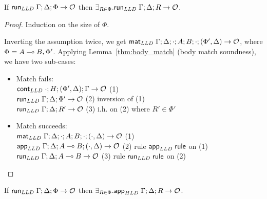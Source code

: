 \begin{theorem}\label{thm:one_rule}
If $\mathsf{run}_{LLD} \; \Gamma; \Delta; \Phi \rightarrow \mathcal{O}$ then
$\exists_{R \in \Phi}. \mathsf{run}_{LLD} \; \Gamma; \Delta; R \rightarrow \mathcal{O}$.
\end{theorem}
\begin{proof}
Induction on the size of $\Phi$.

Inverting the assumption twice, we get $\mathsf{mat}_{LLD} \; \Gamma; \Delta; \cdot; A; B; \cdot;
(\Phi', \Delta) \rightarrow \mathcal{O}$, where $\Phi = A \multimap B, \Phi'$. Applying Lemma~\ref{thm:body_match} (body match soundness), we have two sub-cases:

\begin{itemize}[leftmargin=*]
   \item Match fails: \\ $\mathsf{cont}_{LLD} \; \cdot; H; (\Phi', \Delta); \Gamma \rightarrow
   \mathcal{O}$ \hfill (1)\\
   $\mathsf{run}_{LLD} \; \Gamma; \Delta; \Phi' \rightarrow \mathcal{O}$ \hfill (2) inversion of (1) \\
   $\mathsf{run}_{LLD} \; \Gamma; \Delta; R' \rightarrow \mathcal{O}$ \hfill (3) i.h. on (2) where $R' \in \Phi'$ \\
   \item Match succeeds: \\
   $\mathsf{mat}_{LLD} \; \Gamma; \Delta; \cdot; A; B; \cdot; (\cdot, \Delta) \rightarrow \mathcal{O}$ \hfill (1)\\
   $\mathsf{app}_{LLD} \; \Gamma; \Delta; A \multimap B; (\cdot, \Delta) \rightarrow \mathcal{O}$ \hfill (2) rule $\mathsf{app}_{LLD} \; \mathsf{rule}$ on (1) \\
   $\mathsf{run}_{LLD} \; \Gamma; \Delta; A \multimap B \rightarrow \mathcal{O}$ \hfill (3) rule $\mathsf{run}_{LLD} \; \mathsf{rule}$ on (2) \\
\end{itemize}
\end{proof}

\begin{theorem}[Soundness]\label{thm:soundness}
If $\mathsf{run}_{LLD} \; \Gamma; \Delta; \Phi \rightarrow \mathcal{O}$ then $\exists_{R \in \Phi}.
\mathsf{app}_{HLD} \; \Gamma ; \Delta ; R \rightarrow \mathcal{O}$.
\end{theorem}

